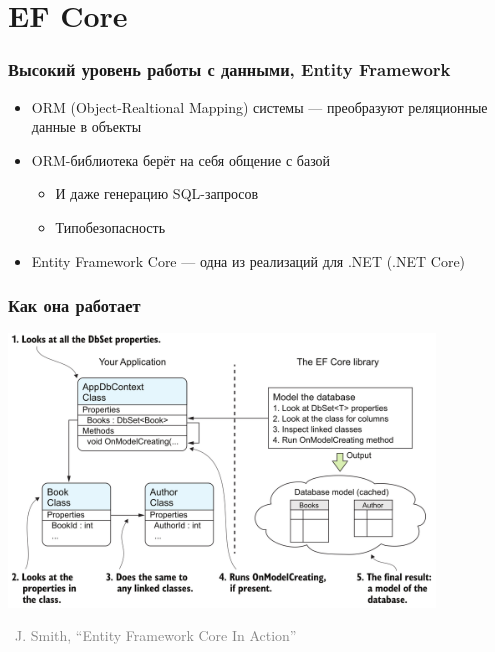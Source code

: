 \documentclass[xetex,mathserif,serif]{beamer}
\newcommand{\attribution}[1] {
\vspace{-5mm}\begin{flushright}\begin{scriptsize}\textcolor{gray}{\textcopyright\, #1}\end{scriptsize}\end{flushright}
}
\begin{document}
    \section{EF Core}

    \begin{frame}
        \frametitle{Высокий уровень работы с данными, Entity Framework}
        \begin{itemize}
            \item ORM (Object-Realtional Mapping) системы --- преобразуют реляционные данные в объекты
            \item ORM-библиотека берёт на себя общение с базой
            \begin{itemize}
                \item И даже генерацию SQL-запросов
                \item Типобезопасность
            \end{itemize}
            \item Entity Framework Core --- одна из реализаций для .NET (.NET Core)
        \end{itemize}
    \end{frame}

    \begin{frame}
        \frametitle{Как она работает}
        \begin{center}
            \includegraphics[width=0.85\textwidth]{efCoreDatabaseModeling.png}
            \attribution{J. Smith, ``Entity Framework Core In Action''}
        \end{center}
    \end{frame}
\end{document}
